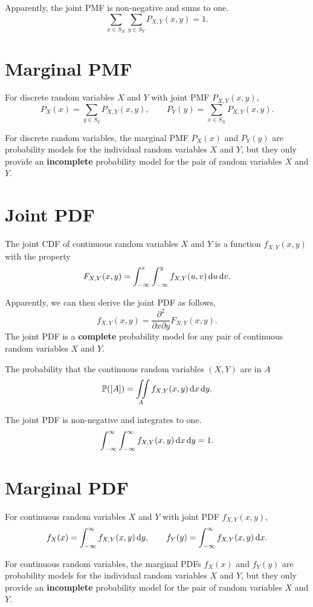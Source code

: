 Apparently, the joint PMF is non-negative and sums to one.
\[\sum_{x\in S_X}\sum_{y\in S_Y}P_{X,Y}(x,y)=1.\]

\section{Marginal PMF}
\begin{theorem}
    For discrete random variables $X$ and $Y$ with joint PMF $P_{X,Y}(x,y)$, 
    \[P_X(x)=\sum_{y\in S_Y}P_{X,Y}(x,y), \qquad P_Y(y)=\sum_{x\in S_X}P_{X,Y}(x,y).\]
\end{theorem}
For discrete random variables, the marginal PMF $P_X(x)$ and $P_Y(y)$ are probability models for the individual random variables $X$ and $Y$, but they only provide an \textbf{incomplete} probability model for the pair of random variables $X$ and $Y$.

\section{Joint PDF}
\begin{definition}
    The joint CDF of continuous random variables $X$ and $Y$ is a function $f_{X,Y}(x,y)$ with the property
    \[F_{X,Y}(x,y)=\int_{-\infty}^{x}\int_{-\infty}^{y}f_{X,Y}(u,v)\mathop{}\!\mathrm{d} u \mathop{}\!\mathrm{d} v.\]
\end{definition}

Apparently, we can then derive the joint PDF as follows,
\[f_{X,Y}(x,y)=\frac{\partial^2}{\partial x \partial y}F_{X,Y}(x,y).\]
The joint PDF is a \textbf{complete} probability model for any pair of continuous random variables $X$ and $Y$.

\begin{theorem}
    The probability that the continuous random variables $(X,Y)$ are in $A$ 
    \[\P{[A]}=\iint\limits_A f_{X,Y}(x,y)\diff x\diff y.\]
\end{theorem}

The joint PDF is non-negative and integrates to one.
\[\int_{-\infty}^{\infty}\int_{-\infty}^{\infty}f_{X,Y}(x,y)\mathop{}\!\mathrm{d} x\mathop{}\!\mathrm{d} y=1.\]

\section{Marginal PDF}
\begin{theorem}
    For continuous random variables $X$ and $Y$ with joint PDF $f_{X,Y}(x,y)$, 
    \[f_X(x)=\int_{-\infty}^{\infty}f_{X,Y}(x,y)\mathop{}\!\mathrm{d} y, \qquad f_Y(y)=\int_{-\infty}^{\infty}f_{X,Y}(x,y)\mathop{}\!\mathrm{d} x.\]
\end{theorem}
For continuous random variables, the marginal PDFs $f_X(x)$ and $f_Y(y)$ are probability models for the individual random variables $X$ and $Y$, but they only provide an \textbf{incomplete} probability model for the pair of random variables $X$ and $Y$.

